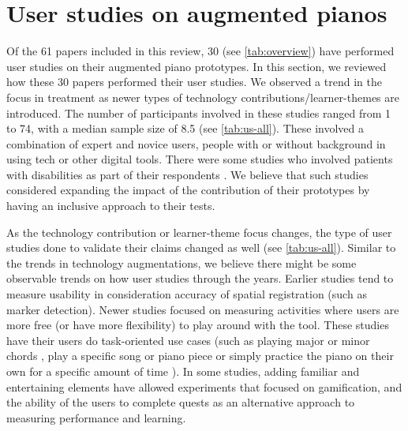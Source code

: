 \documentclass[sigconf, screen, review]{acmart}
\begin{document}
\section{User studies on augmented pianos}
Of the 61 papers included in this review, 30 (see \autoref{tab:overview}) have performed user studies on their augmented piano prototypes. %
In this section, we reviewed how these 30 papers performed their user studies. %
We observed a trend in the focus in treatment as newer types of technology contributions/learner-themes are introduced. 
The number of participants involved in these studies ranged from 1 to 74, with a median sample size of 8.5 (see \autoref{tab:us-all}). These involved a combination of expert and novice users, people with or without background in using tech or other digital tools. There were some studies who involved patients with disabilities as part of their respondents \cite{correa2009computer, chouvatut2013virtual}. We believe that such studies considered expanding the impact of the contribution of their prototypes by having an inclusive approach to their tests. 

As the technology contribution or learner-theme focus changes, the type of user studies done to validate their claims changed as well (see \autoref{tab:us-all}). Similar to the trends in technology augmentations, we believe there might be some observable trends on how user studies through the years. Earlier studies tend to measure usability in consideration accuracy of spatial registration (such as marker detection). Newer studies focused on measuring activities where users are more free (or have more flexibility) to play around with the tool. These studies have their users do task-oriented use cases (such as playing major or minor chords \cite{nugraha2014pemanfaatan, xiao2010mirrorfugue}, play a specific song or piano piece \cite{chow2013music, sandnes2019enhanced,pan2018pilot} or simply practice the piano on their own for a specific amount of time \cite{weing2013piano, raymaekers2014game}). In some studies, adding familiar and entertaining elements have allowed experiments that focused on gamification, and the ability of the users to complete quests as an alternative approach to measuring performance and learning. 
\end{document}
